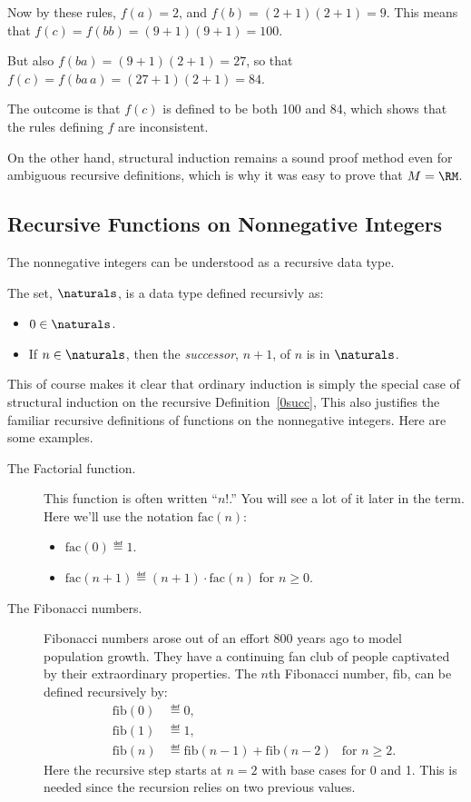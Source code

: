 \begin{definition}
Now by these rules, $f(a) = 2$, and $f(b) = (2+1)(2+1)=9$.  This means
that $f(c) = f(bb)= (9+1)(9+1)=100$.

But also $f(ba) = (9+1)(2+1) = 27$, so that $f(c) = f(ba\,a) = (27 +1)
(2+1) = 84$.

The outcome is that $f(c)$ is defined to be both 100 and 84, which shows
that the rules defining $f$ are inconsistent.

On the other hand, structural induction remains a sound proof method even
for ambiguous recursive definitions, which is why it was easy to prove
that $M=\RM$.

\subsection{Recursive Functions on Nonnegative Integers}

The nonnegative integers can be understood as a recursive data type.
\begin{definition}\label{0succ}
The set, $\naturals$, is a data type defined recursivly as:
\begin{itemize}
\item $0 \in \naturals$.
\item If $n \in \naturals$, then the \emph{successor}, $n+1$, of $n$ is in
$\naturals$.
\end{itemize}

\end{definition}

This of course makes it clear that ordinary induction is simply the
special case of structural induction on the recursive
Definition~\ref{0succ}, This also justifies the familiar recursive
definitions of functions on the nonnegative integers.  Here are some
examples.

\begin{description}
\item[The Factorial function.] This function is often written ``$n!$.''
You will see a lot of it later in the term.  Here we'll use the notation
$\text{fac}(n)$:
\begin{itemize}
\item $\text{fac}(0) \eqdef 1$.
\item $\text{fac}(n+1) \eqdef (n+1)\cdot \text{fac}(n)$ for $n \ge 0$.
\end{itemize}

\item[The Fibonacci numbers.]  Fibonacci numbers arose out of an effort 800
  years ago to model population growth.  They have a continuing fan club of
  people captivated by their extraordinary properties.  The $n$th Fibonacci
  number, $\text{fib}$, can be defined recursively by:
\begin{align*}
\text{fib}(0) &\eqdef 0,\\ 
\text{fib}(1) &\eqdef 1,\\ 
\text{fib}(n) &\eqdef \text{fib}(n-1) + \text{fib}(n-2) &\mbox{for $n \geq 2$.} 
\end{align*}
Here the recursive step starts at $n=2$ with base cases for 0 and 1.  This
is needed since the recursion relies on two previous values.


\end{description}
\end{definition}
